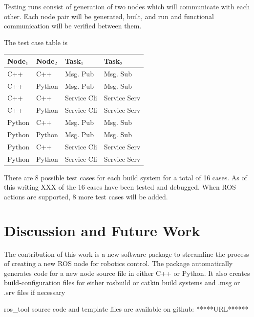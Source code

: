 \documentclass[letterpaper, 10 pt, conference]{ieeeconf}  %
\begin{document}
Testing runs consist of generation of two nodes which will communicate with each other.  Each node pair will be generated, built, and run and functional communication will be verified between them.

The test case table is
\vspace{0.15in}

\begin{tabular}{|l|l|l|l|}\hline
Node$_1$      & Node$_2$      & Task$_1$ & Task$_2$ \\\hline
C++           & C++           & Msg. Pub & Msg. Sub \\\hline
C++           & Python        & Msg. Pub & Msg. Sub \\\hline
C++           & C++           & Service Cli & Service Serv \\\hline
C++           & Python        & Service Cli & Service Serv \\\hline
Python        & C++           & Msg. Pub & Msg. Sub \\\hline
Python        & Python        & Msg. Pub & Msg. Sub \\\hline
Python        & C++           & Service Cli & Service Serv \\\hline
Python        & Python        & Service Cli & Service Serv \\\hline
\end{tabular}

\vspace{0.15in}

There are 8 possible test cases for each build system for a total of 16 cases.  As of this writing XXX of the 16 cases have been tested and debugged.  When ROS actions are supported, 8 more test cases will be added.




\section{Discussion and Future Work}
The contribution of this work is a new software package to streamline the process of creating a new ROS node for robotics control.
The package automatically generates
code for a new node source file in either C++ or Python.  It also creates
build-configuration files for either rosbuild or catkin build systems and
.msg or .srv files if necessary

ros\_tool source code and template files are available on github: *****URL******
\end{document}
